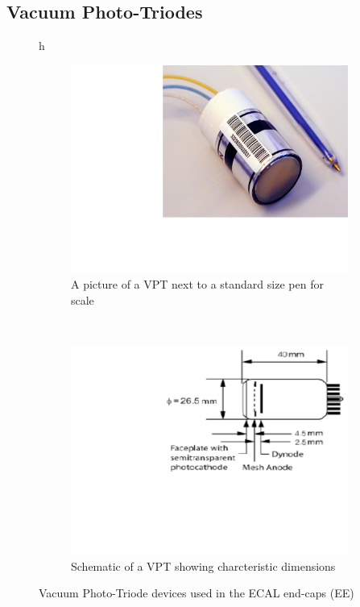 \subsection{Vacuum Photo-Triodes}
\label{vpt_description}

\begin{figure}{h}
    \centering
    \begin{subfigure}[h]{0.450\textwidth}
        \includegraphics[width=\textwidth]{Figures/CMS_Diagrams/ECAL__VPT.pdf}
        \caption{A picture of a VPT next to a standard size pen for scale}\label{fig:ecal_vpt_pic}
      \end{subfigure}
      ~ %
    \begin{subfigure}[h]{0.450\textwidth}
        \includegraphics[width=\textwidth]{Figures/CMS_Diagrams/ECAL__VPT_schematic.pdf}
        \caption{Schematic of a VPT showing charcteristic dimensions}\label{fig:ecal_vpt_schematic}
      \end{subfigure}
      \caption{Vacuum Photo-Triode devices used in the ECAL end-caps (EE)}\label{fig:ecal_vpt}
\end{figure}

